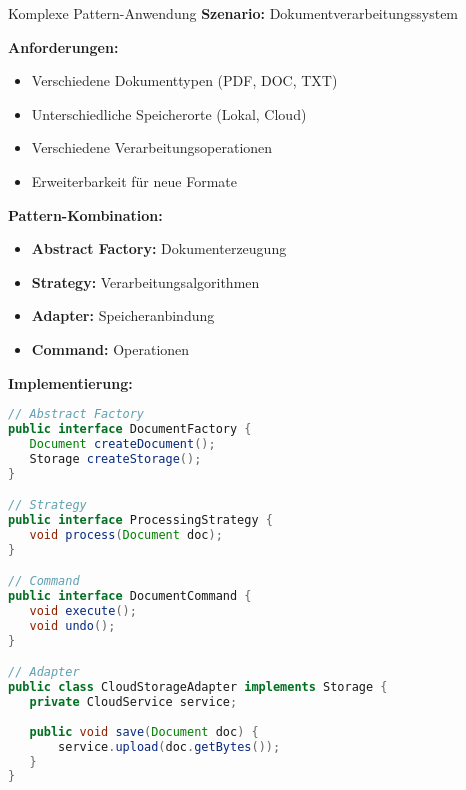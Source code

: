 \begin{example2}{Komplexe Pattern-Anwendung}
\textbf{Szenario:} Dokumentverarbeitungssystem

\textbf{Anforderungen:}
\begin{itemize}
   \item Verschiedene Dokumenttypen (PDF, DOC, TXT)
   \item Unterschiedliche Speicherorte (Lokal, Cloud)
   \item Verschiedene Verarbeitungsoperationen
   \item Erweiterbarkeit für neue Formate
\end{itemize}

\textbf{Pattern-Kombination:}
\begin{itemize}
   \item \textbf{Abstract Factory:} Dokumenterzeugung
   \item \textbf{Strategy:} Verarbeitungsalgorithmen
   \item \textbf{Adapter:} Speicheranbindung
   \item \textbf{Command:} Operationen
\end{itemize}

\textbf{Implementierung:}
\begin{lstlisting}[language=Java, style=basesmol]
// Abstract Factory
public interface DocumentFactory {
   Document createDocument();
   Storage createStorage();
}

// Strategy
public interface ProcessingStrategy {
   void process(Document doc);
}

// Command
public interface DocumentCommand {
   void execute();
   void undo();
}

// Adapter
public class CloudStorageAdapter implements Storage {
   private CloudService service;
   
   public void save(Document doc) {
       service.upload(doc.getBytes());
   }
}
\end{lstlisting}
\end{example2}

